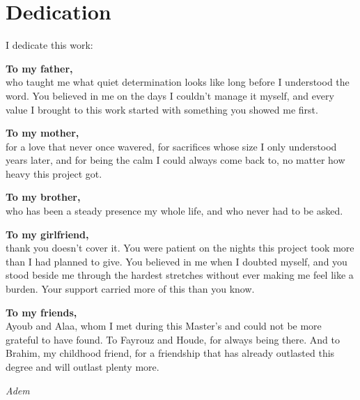 \chapter*{Dedication}

\noindent I dedicate this work:

\vspace{0.5cm}
\noindent\textbf{To my father,}\\
who taught me what quiet determination looks like long before I understood the word. You believed in me on the days I couldn't manage it myself, and every value I brought to this work started with something you showed me first.

\vspace{0.4cm}
\noindent\textbf{To my mother,}\\
for a love that never once wavered, for sacrifices whose size I only understood years later, and for being the calm I could always come back to, no matter how heavy this project got.

\vspace{0.4cm}
\noindent\textbf{To my brother,}\\
who has been a steady presence my whole life, and who never had to be asked.

\vspace{0.4cm}
\noindent\textbf{To my girlfriend,}\\
thank you doesn't cover it. You were patient on the nights this project took more than I had planned to give. You believed in me when I doubted myself, and you stood beside me through the hardest stretches without ever making me feel like a burden. Your support carried more of this than you know.

\vspace{0.4cm}
\noindent\textbf{To my friends,}\\
Ayoub and Alaa, whom I met during this Master's and could not be more grateful to have found. To Fayrouz and Houde, for always being there. And to Brahim, my childhood friend, for a friendship that has already outlasted this degree and will outlast plenty more.

\vspace{1.2cm}
\begin{flushright}
\textit{Adem}
\end{flushright}

\newpage
\thispagestyle{empty}
\mbox{}
